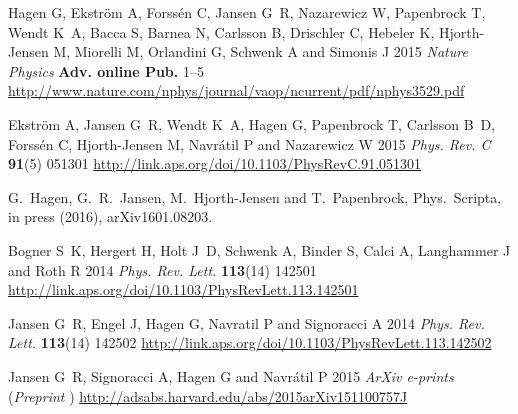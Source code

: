 \documentclass[prc,preprint,superscriptaddress,showpacs,floatfix]{revtex4-1}
\begin{document}
\begin{thebibliography}{99}

{Hagen} G, {Ekstr{\"o}m} A, {Forss{\'e}n} C, {Jansen} G~R, {Nazarewicz} W,
  {Papenbrock} T, {Wendt} K~A, {Bacca} S, {Barnea} N, {Carlsson} B, {Drischler}
  C, {Hebeler} K, {Hjorth-Jensen} M, {Miorelli} M, {Orlandini} G, {Schwenk} A
  and {Simonis} J 2015 {\em Nature Physics\/} {\bf Adv. online Pub.} 1--5
  \urlprefix\url{http://www.nature.com/nphys/journal/vaop/ncurrent/pdf/nphys3529.pdf}

Ekstr\"om A, Jansen G~R, Wendt K~A, Hagen G, Papenbrock T, Carlsson B~D,
  Forss\'en C, Hjorth-Jensen M, Navr\'atil P and Nazarewicz W 2015 {\em Phys.
  Rev. C\/} {\bf 91}(5) 051301
  \urlprefix\url{http://link.aps.org/doi/10.1103/PhysRevC.91.051301}

G.~Hagen, G.~R.~Jansen,  M.~Hjorth-Jensen and T.~Papenbrock, Phys.~Scripta, in press (2016), arXiv1601.08203.



Bogner S~K, Hergert H, Holt J~D, Schwenk A, Binder S, Calci A, Langhammer J and
  Roth R 2014 {\em Phys. Rev. Lett.\/} {\bf 113}(14) 142501
  \urlprefix\url{http://link.aps.org/doi/10.1103/PhysRevLett.113.142501}

Jansen G~R, Engel J, Hagen G, Navratil P and Signoracci A 2014 {\em Phys. Rev.
  Lett.\/} {\bf 113}(14) 142502
  \urlprefix\url{http://link.aps.org/doi/10.1103/PhysRevLett.113.142502}

{Jansen} G~R, {Signoracci} A, {Hagen} G and {Navr{\'a}til} P 2015 {\em ArXiv
  e-prints\/} (\textit{Preprint} )
  \urlprefix\url{http://adsabs.harvard.edu/abs/2015arXiv151100757J}
\end{thebibliography}
\end{document}
